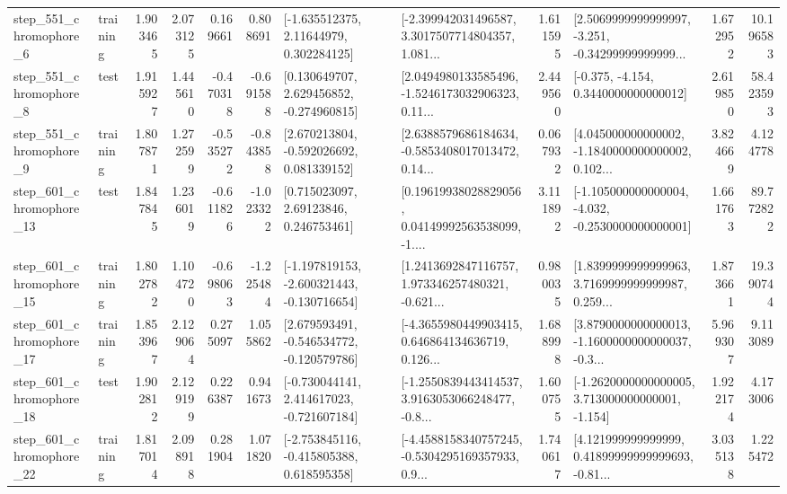 \begin{tabular}{llrrrrllrlrr}
   step\_551\_chromophore\_6 &  training &      1.903465 &    2.073125 &      0.169661 &  0.808691 &     [-1.635512375, 2.11644979, 0.302284125] &  [-2.399942031496587, 3.3017507714804357, 1.081... &       1.611595 &  [2.5069999999999997, -3.251, -0.34299999999999... &            1.672952 &         10.196583 \\
   step\_551\_chromophore\_8 &      test &      1.915927 &    1.445610 &     -0.470318 & -0.691588 &    [0.130649707, 2.629456852, -0.274960815] &  [2.0494980133585496, -1.5246173032906323, 0.11... &       2.449560 &               [-0.375, -4.154, 0.3440000000000012] &            2.619850 &         58.423593 \\
   step\_551\_chromophore\_9 &  training &      1.807871 &    1.272599 &     -0.535272 & -0.843858 &    [2.670213804, -0.592026692, 0.081339152] &  [2.6388579686184634, -0.5853408017013472, 0.14... &       0.067932 &  [4.045000000000002, -1.1840000000000002, 0.102... &            3.824669 &          4.124778 \\
  step\_601\_chromophore\_13 &      test &      1.847845 &    1.236019 &     -0.611826 & -1.023322 &      [0.715023097, 2.69123846, 0.246753461] &  [0.19619938028829056, 0.04149992563538099, -1.... &       3.111892 &  [-1.105000000000004, -4.032, -0.2530000000000001] &            1.661763 &         89.772822 \\
  step\_601\_chromophore\_15 &  training &      1.802782 &    1.104720 &     -0.698063 & -1.225484 &  [-1.197819153, -2.600321443, -0.130716654] &  [1.2413692847116757, 1.973346257480321, -0.621... &       0.980035 &  [1.8399999999999963, 3.7169999999999987, 0.259... &            1.873661 &         19.390744 \\
  step\_601\_chromophore\_17 &  training &      1.853967 &    2.129064 &      0.275097 &  1.055862 &   [2.679593491, -0.546534772, -0.120579786] &  [-4.3655980449903415, 0.646864134636719, 0.126... &       1.688998 &  [3.8790000000000013, -1.1600000000000037, -0.3... &            5.969307 &          9.113089 \\
  step\_601\_chromophore\_18 &      test &      1.902812 &    2.129199 &      0.226387 &  0.941673 &   [-0.730044141, 2.414617023, -0.721607184] &  [-1.2550839443414537, 3.9163053066248477, -0.8... &       1.600755 &   [-1.2620000000000005, 3.713000000000001, -1.154] &            1.922174 &          4.173006 \\
  step\_601\_chromophore\_22 &  training &      1.817014 &    2.098918 &      0.281904 &  1.071820 &   [-2.753845116, -0.415805388, 0.618595358] &  [-4.4588158340757245, -0.5304295169357933, 0.9... &       1.740617 &  [4.121999999999999, 0.41899999999999693, -0.81... &            3.035138 &          1.225472 \\

\end{tabular}
